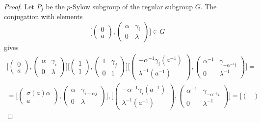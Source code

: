 \documentclass[12pt]{article}
\theoremstyle{definition}
\begin{document}
 \begin{proof}
Let $P_j$ be the $p$-Sylow subgroup of the regular subgroup $G$. The conjugation with elements 
$$
\Big[\begin{pmatrix}
	0\\
	a
	\end{pmatrix}, \begin{pmatrix}
	\alpha &\gamma_{i}\\
	0&\lambda
	\end{pmatrix}\Big]\in G$$
 gives 
 $$
 \begin{array}{l}
\Big[\begin{pmatrix}
	0\\
	a
	\end{pmatrix}, \begin{pmatrix}
	\alpha &\gamma_{i}\\
	0&\lambda 
	\end{pmatrix}\Big]\Big[\begin{pmatrix}
		1\\
		1
		\end{pmatrix},\begin{pmatrix}
		1 & \gamma_j\\
		0&1
		\end{pmatrix}\Big]
 \Big[\begin{pmatrix}
	-\alpha^{-1}\gamma_{i}(a^{-1})\\
	\lambda^{-1}(a^{-1})
	\end{pmatrix}, \begin{pmatrix}
	\alpha^{-1} &\gamma_{-\alpha^{-1}i}\\
	0&\lambda^{-1} 
	\end{pmatrix}\Big]=\\[10pt]
=\Big[\begin{pmatrix}
	\sigma(a)\alpha\\
	a
	\end{pmatrix}, \begin{pmatrix}
	\alpha &\gamma_{i+\alpha j}\\
	0&\lambda 
	\end{pmatrix}\Big],\Big[\begin{pmatrix}
	-\alpha^{-1}\gamma_{i}(a^{-1})\\
	\lambda^{-1}(a^{-1})
	\end{pmatrix}, \begin{pmatrix}
	\alpha^{-1} &\gamma_{-\alpha^{-1}i}\\
	0&\lambda^{-1} 
	\end{pmatrix}\Big]
=\Big[\begin{pmatrix}

\end{pmatrix}
\end{array}$$
\end{proof}
\end{document}
